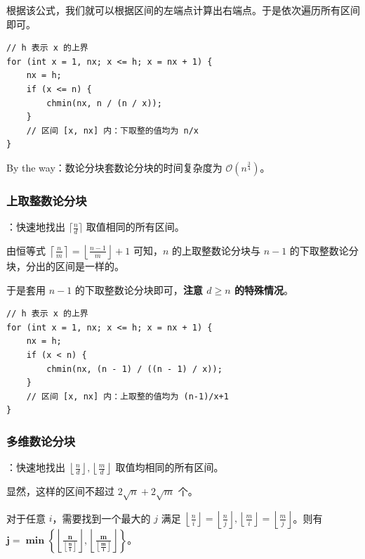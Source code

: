 根据该公式，我们就可以根据区间的左端点计算出右端点。于是依次遍历所有区间即可。

\begin{verbatim}
// h 表示 x 的上界
for (int x = 1, nx; x <= h; x = nx + 1) {
    nx = h;
    if (x <= n) {
        chmin(nx, n / (n / x));
    }
    // 区间 [x, nx] 内：下取整的值均为 n/x
}
\end{verbatim}

\begin{quoteblock}
By the way：数论分块套数论分块的时间复杂度为 $\mathcal{O}(n^{\frac{3}{4}})$。
\end{quoteblock}

\subsubsection{上取整数论分块}

：快速地找出 $\lceil \frac{n}{d} \rceil$ 取值相同的所有区间。

由恒等式 $\left\lceil \frac{n}{m} \right\rceil = \left\lfloor \frac{n - 1}{m} \right\rfloor + 1$ 可知，$n$ 的上取整数论分块与 $n - 1$ 的下取整数论分块，分出的区间是一样的。

于是套用 $n - 1$ 的下取整数论分块即可，\textbf{注意 $d \geq n$ 的特殊情况}。

\begin{verbatim}
// h 表示 x 的上界
for (int x = 1, nx; x <= h; x = nx + 1) {
    nx = h;
    if (x < n) {
        chmin(nx, (n - 1) / ((n - 1) / x));
    }
    // 区间 [x, nx] 内：上取整的值均为 (n-1)/x+1
}
\end{verbatim}

\subsubsection{多维数论分块}

：快速地找出 $\left\lfloor \frac{n}{d} \right\rfloor, \left\lfloor \frac{m}{d} \right\rfloor$ 取值均相同的所有区间。

显然，这样的区间不超过 $2\sqrt{n} + 2\sqrt{m}$ 个。

对于任意 $i$，需要找到一个最大的 $j$ 满足 $\left\lfloor \frac{n}{i} \right\rfloor = \left\lfloor \frac{n}{j} \right\rfloor, \left\lfloor \frac{m}{i} \right\rfloor = \left\lfloor \frac{m}{j} \right\rfloor$。则有 $\boldsymbol{j = \min\left\{ \left\lfloor \frac{n}{ \left\lfloor \frac{n}{i} \right\rfloor } \right\rfloor, \left\lfloor \frac{m}{ \left\lfloor \frac{m}{i} \right\rfloor } \right\rfloor \right\}}$。

